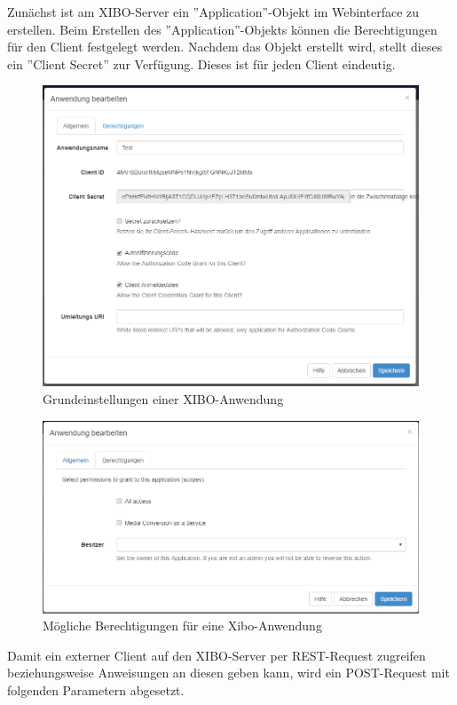 Zunächst ist am XIBO-Server ein ''Application''-Objekt im Webinterface zu erstellen. Beim Erstellen des ''Application''-Objekts können die Berechtigungen für den Client festgelegt werden. Nachdem das Objekt erstellt wird, stellt dieses ein ''Client Secret'' zur Verfügung. Dieses ist für jeden Client eindeutig.
\begin{figure}[H]
\centering
\includegraphics[width=1.0\textwidth]{images/03_XIBO-Server/03_EditApplikation}
\caption{Grundeinstellungen einer XIBO-Anwendung}
\label{fig:mediaNav}
\end{figure}
\begin{figure}[H]
\centering
\includegraphics[width=1.0\textwidth]{images/03_XIBO-Server/03_ApplikationPermission}
\caption{Mögliche Berechtigungen für eine Xibo-Anwendung}
\label{fig:mediaNav}
\end{figure}

Damit ein externer Client auf den XIBO-Server per REST-Request zugreifen beziehungsweise Anweisungen an diesen geben kann, wird ein POST-Request mit folgenden Parametern abgesetzt.

